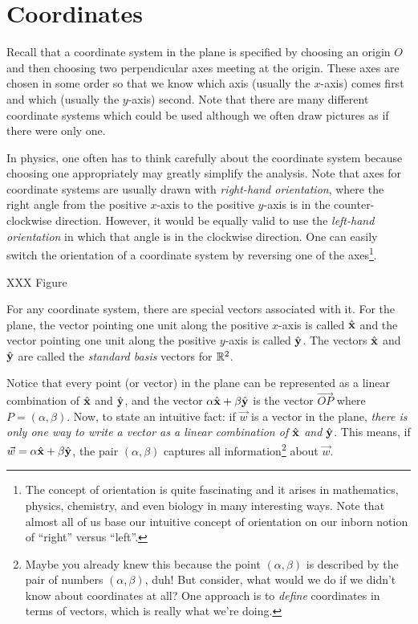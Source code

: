 \section{Coordinates}
Recall that a coordinate system in the plane is specified by choosing
an origin $O$ and then choosing two perpendicular axes meeting at
the origin.  These axes are chosen in some order so that we know which
axis (usually the $x$-axis) comes first and which (usually the
$y$-axis) second.   Note that there are many different coordinate systems
which could be used although we often draw pictures
as if there were only one.

In physics, one often has to think carefully about the
coordinate system because
choosing one appropriately may greatly simplify the
analysis.  Note that axes for coordinate systems are usually drawn with 
\emph{right-hand orientation}, where the right angle from the positive
$x$-axis to the positive $y$-axis is in the counter-clockwise
direction.  However, it would be equally valid to use the
\emph{left-hand orientation} in which that angle is in the
clockwise direction.  One can easily switch the orientation of
a coordinate system by reversing one of the axes\footnote{
	The concept of
orientation is quite fascinating and it arises in mathematics,
physics, chemistry, and even biology in many interesting ways.
Note that almost all of us base our intuitive concept of orientation
on our inborn notion of ``right'' versus ``left''.}.

XXX Figure

For any coordinate system, there are special vectors
associated with it.  For the plane, the vector pointing one unit along
the positive $x$-axis is called ${\hat {\mathbf x}}$ and the vector pointing one unit along
the positive $y$-axis is called ${\hat {\mathbf y}}$.  The vectors ${\hat {\mathbf x}}$ and ${\hat {\mathbf y}}$ are
called the \emph{standard basis} vectors for $\mathbb{R}^2$.

Notice that every point (or vector) in the plane can be represented
as a linear combination of ${\hat {\mathbf x}}$ and ${\hat {\mathbf y}}$, and the vector
$\alpha{\hat {\mathbf x}}+\beta{\hat {\mathbf y}}$ is the vector $\overrightarrow{OP}$ where
$P=(\alpha,\beta)$.  Now, to state an intuitive fact:  if $\vec w$ is
a vector in the plane, \emph{there is
only one way to write a vector as a linear combination of
${\hat {\mathbf x}}$ and ${\hat {\mathbf y}}$}.  This means, if $\vec w=\alpha{\hat {\mathbf x}}+\beta{\hat {\mathbf y}}$,
the pair $(\alpha,\beta)$ captures all information\footnote{
	Maybe you already knew this because the point $(\alpha,\beta)$
	is described by the pair of numbers $(\alpha,\beta)$, duh!
	But consider, what would we do if we didn't know about coordinates
	at all? One approach is to \emph{define} coordinates in terms
	of vectors, which is really what we're doing.
} about $\vec w$.


